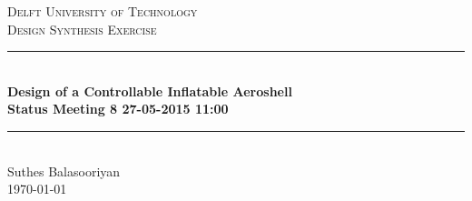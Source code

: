 \documentclass[12pt]{report}
\newcommand{\HRule}{\rule{\linewidth}{0.04cm}}
\begin{document}
\clearpage
\thispagestyle{empty}

\begin{center}

\textsc{\LARGE Delft University of Technology}\\[0.3cm]
\textsc{\Large Design Synthesis Exercise}\\[0.5cm]

\HRule \\[0.4cm]
{\Large \bfseries Design of a Controllable Inflatable Aeroshell}\\[0.2cm]
{\Huge \bfseries Status Meeting 8 27-05-2015 11:00}\\[0.2cm]
\HRule \\[1.2cm]

\vspace{10mm}
Suthes Balasooriyan
\\
\today
\\


\end{center}



\newpage

\end{document}
